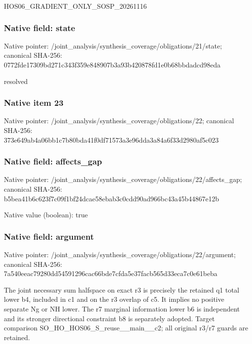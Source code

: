 \documentclass[10pt,a4paper]{article}
\begin{document}
\begingroup\raggedright\sloppy HOS06\_\allowbreak{}GRADIENT\_\allowbreak{}ONLY\_\allowbreak{}SOSP\_\allowbreak{}20261116\par\endgroup

\subsubsection{Native field: state}
Native pointer: /joint\_\allowbreak{}analysis/synthesis\_\allowbreak{}coverage/obligations/21/state; canonical SHA-256: 0772fde17309bd271c343f359e848907b3a93b420878fd1e0b68bbdadcd98eda

\begingroup\raggedright\sloppy resolved\par\endgroup

\subsubsection{Native item 23}
Native pointer: /joint\_\allowbreak{}analysis/synthesis\_\allowbreak{}coverage/obligations/22; canonical SHA-256: 373e649ab4a06bb1c7b80bda41f0df71573a3e96dda3a84a6f33d2980af5c023

\subsubsection{Native field: affects\_\allowbreak{}gap}
Native pointer: /joint\_\allowbreak{}analysis/synthesis\_\allowbreak{}coverage/obligations/22/affects\_\allowbreak{}gap; canonical SHA-256: b5bea41b6c623f7c09f1bf24dcae58ebab3c0cdd90ad966bc43a45b44867e12b

Native value (boolean): true

\subsubsection{Native field: argument}
Native pointer: /joint\_\allowbreak{}analysis/synthesis\_\allowbreak{}coverage/obligations/22/argument; canonical SHA-256: 7a540eeac79280dd54591296cac66bde7cfda5e37facb565d33eca7c0e61beba

\begingroup\raggedright\sloppy The joint necessary sum halfspace on exact r3 is precisely the retained q1 total lower b4,\allowbreak{} included in c1 and on the r3 overlap of c5. It implies no positive separate Ng or NH lower. The r7 marginal information lower b6 is independent and its stronger directional constraint b8 is separately adopted. Target comparison SO\_\allowbreak{}HO\_\allowbreak{}HOS06\_\allowbreak{}S\_\allowbreak{}reuse\_\allowbreak{}\_\allowbreak{}main\_\allowbreak{}\_\allowbreak{}c2;\allowbreak{} all original r3/\allowbreak{}r7 guards are retained.\par\endgroup
\end{document}
